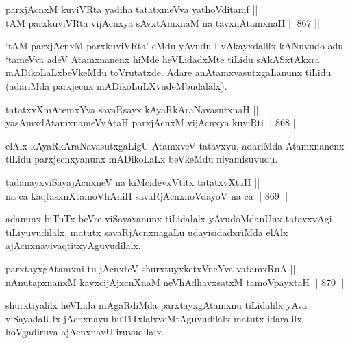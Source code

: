 
\begin{shl}
parxjAcnxM kuviVRta yadiha tatatxmeVva yathoVditamf || \\
tAM parxkuviVRta vijAcnxya sAvxtAmxnaM na tavxnAtamxnaH \hfill || 867 ||  
\end{shl}

\begin{artha}
`tAM parxjAcnxM parxkuviVRta' eMdu yAvudu I vAkayxdalilx kANuvudo adu `tameVva adeV Atamxnanenx hiMde heVLidadxMte tiLidu sAkASxtAkxra mADikoLaLxbeVkeMdu toVrutatxde. Adare anAtamxvasutxgaLanunx tiLidu (adariMda parxjecnx mADikoLuLXvudeMbudalalx).
\end{artha}


\begin{shl}
tatatxvXmAtemxYva savaRsayx kAyaRkAraNavasutxnaH || \\
yasAmxdAtamxnameVvAtaH parxjAcnxM vijAcnxya kuviRti \hfill || 868 ||  
\end{shl}

\begin{artha}
elAlx kAyaRkAraNavasutxgaLigU AtamxveV tatavxvu, adariMda Atamxnanenx tiLidu parxjecnxyanunx mADikoLaLx beVkeMdu niyamisuvudu.
\end{artha}

\begin{shl}
tadanayxviSayajAcnxneV na kiMcidevxVtitx tatatxvXtaH || \\
na ca kaqtasxnXtamoVhAniH savaRjAcnxnoVdayoV na ca \hfill || 869 ||  
\end{shl}

\begin{artha}
adanunx biTuTx beVre viSayavanunx tiLidalalx yAvudoMdanUnx tatavxvAgi tiLiyuvudilalx, matutx savaRjAcnxnagaLu udayisidadxriMda elAlx ajAcnxnavivaqtitxyAguvudilalx.
\end{artha}


\begin{shl}
parxtayxgAtamxni tu jAcnxteV shurxtuyxketxVneYva vatamxRnA || \\
nAnutapxnanxM kavxcijAjxcnXnaM neVhAdhavxsatxM tamoV\s payxtaH \hfill || 870 ||  
\end{shl}

\begin{artha}
shurxtiyalilx heVLida mAgaRdiMda parxtayxgAtamxnu tiLidalilx yAva viSayadalUlx jAcnxnavu huTiTxlalxveMtAguvudilalx matutx idaralilx hoVgadiruva ajAcnxnavU iruvudilalx.
\end{artha}

